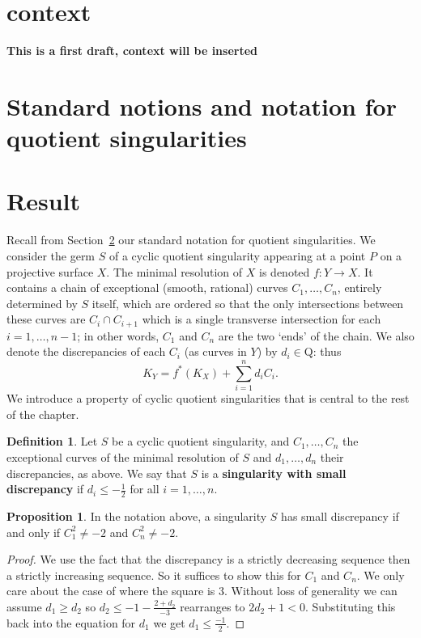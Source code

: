 \documentclass[11pt]{report}
\theoremstyle{definition}
\theoremstyle{definition}
\theoremstyle{definition}
\newtheorem{prop}[thm]{Proposition}
\theoremstyle{definition}
\newtheorem{dfn}[thm]{Definition}
\theoremstyle{definition}
\theoremstyle{definition}
\theoremstyle{definition}
\theoremstyle{definition}
\newcommand{\Q}{\mathrm{Q}}
\begin{document}
 

\section{context}
\textbf{This is a first draft, context will be inserted}

\section{Standard notions and notation for quotient singularities}
\label{sec!notation}

\section{Result}

Recall from Section~\ref{sec!notation} our standard notation for quotient singularities.
We consider the germ $S$ of a cyclic quotient singularity appearing at a point $P$ on a 
projective surface $X$.
The minimal resolution of $X$ is denoted $f\colon Y \longrightarrow X$. It contains a chain of
exceptional (smooth, rational)
curves $C_1,\dots,C_n$, entirely determined by $S$ itself, which are ordered so
that the only intersections between these curves are
$C_i\cap C_{i+1}$ which is a single transverse intersection for each $i=1,\dots,n-1$; 
in other words,
$C_1$ and $C_n$ are the two `ends' of the chain.
We also denote the discrepancies of each $C_i$ (as curves in $Y$) by $d_i\in\Q$: thus
\[
K_Y = f^*(K_X) + \sum_{i=1}^n d_i C_i.
\]
We introduce a property of cyclic quotient singularities that is central to the rest of the chapter.
\begin{dfn}
Let $S$ be a cyclic quotient singularity, and $C_1, \dots ,C_n$ the exceptional curves of the minimal resolution of $S$ and $d_1, \dots,d_n$ their discrepancies, as above.
We say that $S$ is a {\bf singularity with small discrepancy} if $d_i \leq -\frac{1}{2}$ for
all $i=1,\dots,n$.
\end{dfn}

\begin{prop}
In the notation above,
a singularity $S$ has small discrepancy if and only if $C_1^2 \neq -2$ and $C_n^2 \neq -2$.
\end{prop}
\begin{proof}
 We use the fact that the discrepancy is a strictly decreasing sequence then a strictly increasing sequence. So it suffices to show this for $C_1$ and $C_n$. We only care about the case of where the square is $3$. Without loss of generality we can assume $d_1 \geq d_2$ so $ d_2 \leq -1 - \frac{2 + d_2}{-3}$ rearranges to $2d_2 + 1 < 0$. Substituting this back into the equation for $d_1$ we get $d_1 \leq  \frac{-1}{2}$. 
 \end{proof}
\end{document}
